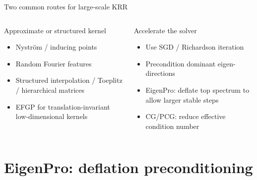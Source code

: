 \documentclass[aspectratio=169,11pt]{ctexbeamer}
\begin{document}
\begin{frame}{Two common routes for large-scale KRR}
\begin{columns}[T,onlytextwidth]
\begin{block}{Approximate or structured kernel}
\begin{itemize}
  \item Nystr\"om / inducing points
  \item Random Fourier features
  \item Structured interpolation / Toeplitz / hierarchical matrices
  \item EFGP for translation-invariant low-dimensional kernels
\end{itemize}
\end{block}
\begin{block}{Accelerate the solver}
\begin{itemize}
  \item Use SGD / Richardson iteration
  \item Precondition dominant eigen-directions
  \item EigenPro: deflate top spectrum to allow larger stable steps
  \item CG/PCG: reduce effective condition number
\end{itemize}
\end{block}
\end{columns}
\vspace{0.35cm}
\begin{center}
\end{center}
\end{frame}

\section{EigenPro: deflation preconditioning}
\end{document}
